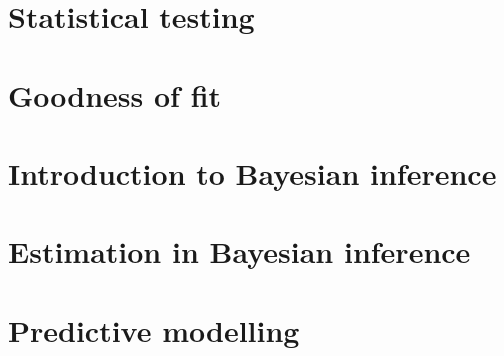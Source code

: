 \documentclass[a4paper]{article}
\begin{document}
\newpage
\section{Statistical testing}
\begin{mdframed}[style=Summary]
    
\end{mdframed}
\newpage
\section{Goodness of fit}
\begin{mdframed}[style=Summary]
    
\end{mdframed}
\newpage
\section{Introduction to Bayesian inference}
\begin{mdframed}[style=Summary]
    
\end{mdframed}
\newpage
\section{Estimation in Bayesian inference}
\begin{mdframed}[style=Summary]
    
\end{mdframed}
\newpage
\section{Predictive modelling}
\begin{mdframed}[style=Summary]
    
\end{mdframed}
\newpage
\end{document}
